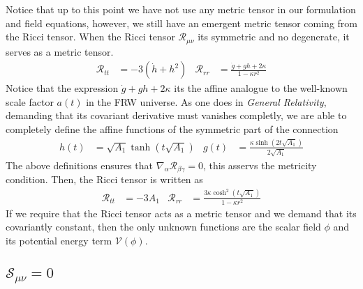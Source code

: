 \documentclass[10pt,a4paper]{article}
\begin{document}
Notice that up to this point we have not use any metric tensor in our formulation and field equations, however, we still have an emergent metric 
tensor coming from the Ricci tensor. When the Ricci tensor $\mathcal{R}_{\mu\nu}$ its symmetric and no degenerate, it serves as a metric tensor.
\begin{align}
  \mathcal{R}_{tt} & = -3\left(\dot{h} + h^2\right) & \mathcal{R}_{rr} & = \frac{\dot{g} + gh + 2\kappa}{1 - \kappa r^2}
\end{align}
Notice that the expression $\dot{g} + gh + 2\kappa$ its the affine analogue to the well-known scale factor $a(t)$ in the FRW universe. As 
one does in \textit{General Relativity}, demanding that its covariant derivative must vanishes completly, we are able 
to completely define the affine functions of the symmetric part of the connection
\begin{align}
  h(t) & = \sqrt{A_1}\tanh\left(t\sqrt{A_1}\right) & g(t) & = \frac{\kappa \sinh\left(2t\sqrt{A_1}\right) }{2\sqrt{A_1}}
\end{align}
The above definitions ensures that $\nabla_\alpha \mathcal{R}_{\beta\gamma} = 0$, this asservs the metricity condition. Then, the Ricci tensor
is written as
\begin{align}
  \mathcal{R}_{tt} & = -3A_1 & \mathcal{R}_{rr} & =  \frac{3\kappa \cosh^2(t\sqrt{A_1})}{1 - \kappa r^2}
\end{align}
If we require that the Ricci tensor acts as a metric tensor and we demand that its covariantly constant, then 
the only unknown functions are the scalar field $\phi$ and its potential energy term $\mathcal{V}(\phi)$.

\subsection{$\mathcal{S}_{\mu\nu} = 0 $}
\end{document}
